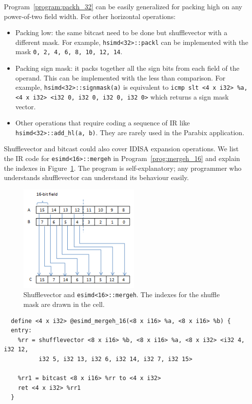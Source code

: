 Program~\ref{program:packh_32} can be easily generalized for packing high on any power-of-two field width. For other horizontal operations:
\begin{itemize}
    \item Packing low: the same bitcast need to be done but shufflevector with a different mask. For example, {\tt hsimd<32>::packl} can be implemented with the mask {\tt 0, 2, 4, 6, 8, 10, 12, 14}.
    \item Packing sign mask: it packs together all the sign bits from each field of the operand. This can be implemented with the less than comparison. For example, {\tt hsimd<32>::signmask(a)} is equivalent to \verb|icmp slt <4 x i32> %a, <4 x i32> <i32 0, i32 0, i32 0, i32 0>| which returns a {\tt <4 x i1>} sign mask vector.
    \item Other operations that require coding a sequence of IR like {\tt hsimd<32>::add\_hl(a, b)}. They are rarely used in the Parabix application.
\end{itemize}

Shufflevector and bitcast could also cover IDISA expansion operations. We list the IR code for {\tt esimd<16>::mergeh} in Program~\ref{prog:mergeh_16} and explain the indexes in Figure~\ref{fig:mergeh_16}. The program is self-explanatory; any programmer who understands shufflevector can understand its behaviour easily.

\begin{figure}[ht!]
\centering
\includegraphics[width=60mm]{draw/mergeh_16.png}
\caption[Implement {\tt esimd<16>::mergeh} with shufflevector]{Shufflevector and {\tt esimd<16>::mergeh}. The indexes for the shuffle mask are drawn in the cell.}
\label{fig:mergeh_16}
\end{figure}

\begin{program}
\begin{verbatim}
  define <4 x i32> @esimd_mergeh_16(<8 x i16> %a, <8 x i16> %b) {
  entry:
    %rr = shufflevector <8 x i16> %b, <8 x i16> %a, <8 x i32> <i32 4, i32 12,
          i32 5, i32 13, i32 6, i32 14, i32 7, i32 15>

    %rr1 = bitcast <8 x i16> %rr to <4 x i32>
    ret <4 x i32> %rr1
  }
\end{verbatim}
\caption[Shufflevector implementation of mergeh.]{Shufflevector and {\tt esimd<16>::mergeh} in LLVM IR\@. Expansion operations double the width of fields.}
\label{prog:mergeh_16}
\end{program}

